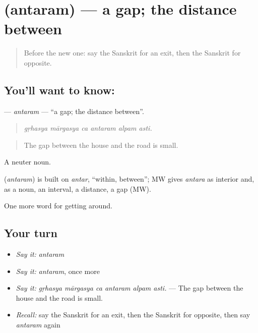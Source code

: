 \section[\texorpdfstring{\sk{अन्तरम्} (antaram)}{अन्तरम् (antaram)}]{ (antaram) — a gap; the distance between}

\label{lesson:SA-C423-antaram}



\begin{quote}
Before the new one: say the Sanskrit for an exit, then the Sanskrit for opposite.
\end{quote}

\subsection*{You'll want to know: }
\textbf{} — \emph{antaram} — \textquotedblleft{}a gap; the distance between\textquotedblright{}.

\begin{quote}
     
\end{quote}

\begin{quote}
\emph{gṛhasya mārgasya ca antaram alpam asti.}
\end{quote}

\begin{quote}
The gap between the house and the road is small.
\end{quote}

A neuter noun.

\begin{cousinweb}
\textbf{} (\emph{antaram}) is built on \emph{antar}, \textquotedblleft{}within, between\textquotedblright{}; MW gives \emph{antara} as interior and, as a noun, an interval, a distance, a gap (MW).
\end{cousinweb}

\begin{grammarlens}[title={What you've built}]
One more word for getting around.
\end{grammarlens}

\subsection*{Your turn}
\begin{itemize}
\raggedright
  \item \emph{Say it:} \emph{antaram}
  \item \emph{Say it:} \emph{antaram}, once more
  \item \emph{Say it:} \emph{gṛhasya mārgasya ca antaram alpam asti.} — The gap between the house and the road is small.
  \item \emph{Recall:} say the Sanskrit for an exit, then the Sanskrit for opposite, then say \emph{antaram} again
\end{itemize}

